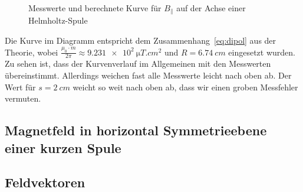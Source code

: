\begin{figure}[H]
\centering
{}
\caption{Messwerte und berechnete Kurve für $B_\parallel$ auf der Achse einer Helmholtz-Spule}
\label{fig:axialaufachsekurz}
\end{figure}

Die Kurve im Diagramm entspricht dem Zusammenhang~\cref{eq:dipol} aus der Theorie, wobei $\frac{\mu_0\cdot m}{2\pi}\approx \SI{9.231e2}{\micro T.cm^2}$ und $R=\SI{6.74}{cm}$ eingesetzt wurden.
Zu sehen ist, dass der Kurvenverlauf im Allgemeinen mit den Messwerten übereinstimmt. Allerdings weichen fast alle Messwerte leicht nach oben ab. Der Wert für $s=\SI{2}{cm}$ weicht so weit nach oben ab, dass wir einen groben Messfehler vermuten.
\subsection{Magnetfeld in horizontal Symmetrieebene einer kurzen Spule}

\subsection{Feldvektoren}

